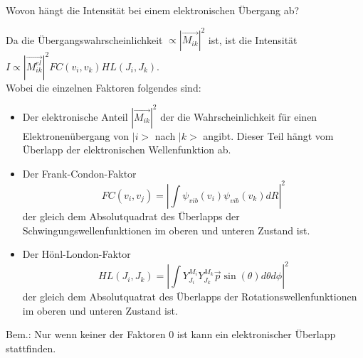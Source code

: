 \documentclass[a5paper,12pt,ngerman,grid=front %
,print
]{kartei}
\begin{document}
	\begin{karte}{
		Wovon hängt die Intensität bei einem elektronischen Übergang ab?
		}
		
		Da die Übergangswahrscheinlichkeit $ \propto |\vec{M_{ik}}|^2 $ ist, ist die Intensität $ I \propto |\vec{M_{ik}^{el}}|^2 FC(v_i, v_k) HL(J_i, J_k)  $. 
		\\
		Wobei die einzelnen Faktoren folgendes sind: \\
		\begin{itemize}
			\item Der elektronische Anteil $ |\vec{M_{ik}} |^2 $ der die Wahrscheinlichkeit für einen Elektronenübergang von $ | i > $ nach $ |k> $ angibt. Dieser Teil hängt vom Überlapp der elektronischen Wellenfunktion ab.
			\item Der Frank-Condon-Faktor
			$$  FC(v_i,v_j) = \left|    \int  \psi_{vib}(v_i)    \psi_{vib}(v_k)  dR  \right| ^2     $$
			der gleich dem Absolutquadrat des Überlapps der Schwingungswellenfunktionen im oberen und unteren Zustand ist.
			\item Der Hönl-London-Faktor
			$$   HL(  J_i, J_k  )  =  \left|    \int Y_{J_{i}}^{ M_i }    Y_{J_{k}}^{ M_k } \vec{p} \sin(\theta) d\theta d\phi    \right|^2    $$
			der gleich dem Absolutquatrat des Überlapps der Rotationswellenfunktionen im oberen und unteren Zustand ist.
		\end{itemize}
		Bem.: Nur wenn keiner der Faktoren 0 ist kann ein elektronischer Überlapp stattfinden.
	\end{karte}
	
	
\end{document}
